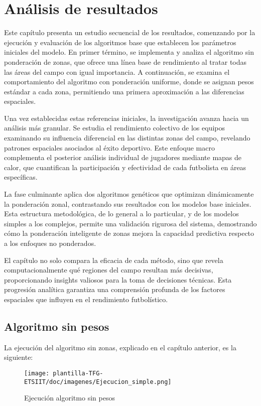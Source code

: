 \chapter{Análisis de resultados}

Este capítulo presenta un estudio secuencial de los resultados, comenzando por la ejecución y evaluación de los algoritmos base que establecen los parámetros iniciales del modelo. En primer término, se implementa y analiza el algoritmo sin ponderación de zonas, que ofrece una línea base de rendimiento al tratar todas las áreas del campo con igual importancia. A continuación, se examina el comportamiento del algoritmo con ponderación uniforme, donde se asignan pesos estándar a cada zona, permitiendo una primera aproximación a las diferencias espaciales.

Una vez establecidas estas referencias iniciales, la investigación avanza hacia un análisis más granular. Se estudia el rendimiento colectivo de los equipos examinando su influencia diferencial en las distintas zonas del campo, revelando patrones espaciales asociados al éxito deportivo. Este enfoque macro complementa el posterior análisis individual de jugadores mediante mapas de calor, que cuantifican la participación y efectividad de cada futbolista en áreas específicas.

La fase culminante aplica dos algoritmos genéticos que optimizan dinámicamente la ponderación zonal, contrastando sus resultados con los modelos base iniciales. Esta estructura metodológica, de lo general a lo particular, y de los modelos simples a los complejos, permite una validación rigurosa del sistema, demostrando cómo la ponderación inteligente de zonas mejora la capacidad predictiva respecto a los enfoques no ponderados.

El capítulo no solo compara la eficacia de cada método, sino que revela computacionalmente qué regiones del campo resultan más decisivas, proporcionando insights valiosos para la toma de decisiones técnicas. Esta progresión analítica garantiza una comprensión profunda de los factores espaciales que influyen en el rendimiento futbolístico.

\section{Algoritmo sin pesos}
La ejecución del algoritmo sin zonas, explicado en el capítulo anterior, es la siguiente:

\begin{figure}[H]
    \centering
    \texttt{[image: plantilla-TFG-ETSIIT/doc/imagenes/Ejecucion\_simple.png]}
    \caption{Ejecución algoritmo sin pesos}
    \label{fig:etiqueta-imagen}
\end{figure}

